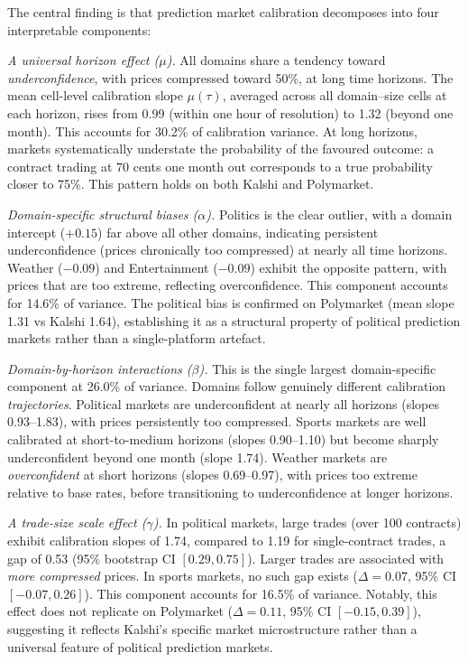 \documentclass[numsec,webpdf,modern,medium]{oup-authoring-template}
\theoremstyle{thmstyleone}%
\theoremstyle{thmstyletwo}%
\theoremstyle{thmstylethree}%
\begin{document}
The central finding is that prediction market calibration decomposes into four interpretable components:

\emph{A universal horizon effect ($\mu$).} All domains share a tendency toward \emph{underconfidence}, with prices compressed toward 50\%, at long time horizons. The mean cell-level calibration slope $\mu(\tau)$, averaged across all domain--size cells at each horizon, rises from 0.99 (within one hour of resolution) to 1.32 (beyond one month). This accounts for 30.2\% of calibration variance. At long horizons, markets systematically understate the probability of the favoured outcome: a contract trading at 70 cents one month out corresponds to a true probability closer to 75\%. This pattern holds on both Kalshi and Polymarket.

\emph{Domain-specific structural biases ($\alpha$).} Politics is the clear outlier, with a domain intercept ($+0.15$) far above all other domains, indicating persistent underconfidence (prices chronically too compressed) at nearly all time horizons. Weather ($-0.09$) and Entertainment ($-0.09$) exhibit the opposite pattern, with prices that are too extreme, reflecting overconfidence. This component accounts for 14.6\% of variance. The political bias is confirmed on Polymarket (mean slope 1.31 vs Kalshi 1.64), establishing it as a structural property of political prediction markets rather than a single-platform artefact.

\emph{Domain-by-horizon interactions ($\beta$).} This is the single largest domain-specific component at 26.0\% of variance. Domains follow genuinely different calibration \emph{trajectories}. Political markets are underconfident at nearly all horizons (slopes 0.93--1.83), with prices persistently too compressed. Sports markets are well calibrated at short-to-medium horizons (slopes 0.90--1.10) but become sharply underconfident beyond one month (slope 1.74). Weather markets are \emph{overconfident} at short horizons (slopes 0.69--0.97), with prices too extreme relative to base rates, before transitioning to underconfidence at longer horizons.

\emph{A trade-size scale effect ($\gamma$).} In political markets, large trades (over 100 contracts) exhibit calibration slopes of 1.74, compared to 1.19 for single-contract trades, a gap of 0.53 (95\% bootstrap CI $[0.29, 0.75]$). Larger trades are associated with \emph{more compressed} prices. In sports markets, no such gap exists ($\Delta = 0.07$, 95\% CI $[-0.07, 0.26]$). This component accounts for 16.5\% of variance. Notably, this effect does not replicate on Polymarket ($\Delta = 0.11$, 95\% CI $[-0.15, 0.39]$), suggesting it reflects Kalshi's specific market microstructure rather than a universal feature of political prediction markets.
\end{document}
